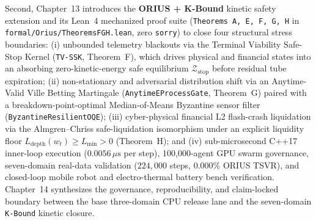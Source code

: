 Second, Chapter~13 introduces the \textbf{ORIUS + K-Bound} kinetic safety extension and its
Lean~4 mechanized proof suite (\texttt{Theorems~A, E, F, G, H} in
\texttt{formal/Orius/TheoremsFGH.lean}, zero \texttt{sorry}) to close four structural
stress boundaries: (i) unbounded telemetry blackouts via the Terminal Viability Safe-Stop
Kernel (\texttt{TV-SSK}, Theorem~F), which drives physical and financial states into an
absorbing zero-kinetic-energy safe equilibrium $\mathcal{Z}_{\mathrm{stop}}$ before residual
tube expiration; (ii) non-stationary and adversarial distribution shift via an
Anytime-Valid Ville Betting Martingale (\texttt{AnytimeEProcessGate}, Theorem~G) paired
with a breakdown-point-optimal Median-of-Means Byzantine sensor filter
(\texttt{ByzantineResilientOQE}); (iii) cyber-physical financial L2 flash-crash liquidation
via the Almgren--Chriss safe-liquidation isomorphism under an explicit liquidity floor
$L_{\mathrm{depth}}(w_t) \ge L_{\min} > 0$ (Theorem~H); and (iv) sub-microsecond C++17
inner-loop execution ($0.0056\,\mu\text{s}$ per step), 100,000-agent GPU swarm governance,
seven-domain real-data validation ($224,000$ steps, $0.000\%$ ORIUS TSVR), and closed-loop
mobile robot and electro-thermal battery bench verification. Chapter~14 synthesizes the
governance, reproducibility, and claim-locked boundary between the base three-domain CPU
release lane and the seven-domain \texttt{K-Bound} kinetic closure.
